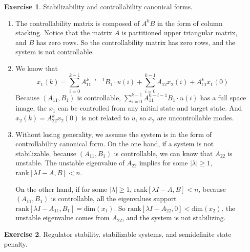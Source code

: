 \documentclass[11pt,a4paper]{report}
\theoremstyle{definition}\newtheorem{exercise}{Exercise}[chapter]
\begin{document}
\begin{exercise}Stabilizability and controllability canonical forms.\\
\end{exercise}
\begin{answer}
\begin{enumerate}[label=(\alph*)]
    \item The controllability matrix is composed of $A^kB$ in the form of column stacking. Notice that the matrix $A$ is partitioned upper triangular matrix, and $B$ has zero rows. So the controllability matrix has zero rows, and the system is not controllable.
    \item We know that
    \begin{equation}
        x_{1}\left(k\right)=\sum_{i=0}^{k-1}A_{11}^{k-i-1}B_1\cdot u\left(i\right)+\sum_{i=0}^{k-1}A_{12}x_{2}\left(i\right)+A_{11}^{k}x_1(0)
    \end{equation}
    Because $(A_{11},B_1)$ is controllable, $\sum_{i=0}^{k-1}A_{11}^{k-i-1}B_1\cdot u\left(i\right)$ has a full space image, the $x_{1}$ can be controlled from any initial state and target state. And $x_2(k)=A_{22}^k x_2(0)$ is not related to $u$, so $x_2$ are uncontrollable modes.
    
    \item Without losing generality, we assume the system is in the form of controllability canonical form. On the one hand, if a system is not stabilizable, because $(A_{11}, B_1)$ is controllable, we can know that $A_{22}$ is unstable. The unstable eigenvalue of $A_{22}$ implies for some $|\lambda|\geq 1$, $\text{rank}[\lambda I - A, B]<n$.

    On the other hand, if for some $|\lambda|\geq 1$, $\text{rank}[\lambda I - A, B]<n$, because $(A_{11}, B_1)$ is controllable, all the eigenvalues support $\text{rank}[\lambda I - A_{11}, B_1]=\text{dim}(x_1)$. So $\text{rank}[\lambda I - A_{22}, 0]<\text{dim}(x_2)$, the unstable eigenvalue comes from $A_{22}$, and the system is not stabilizing.
\end{enumerate}
\end{answer}


\begin{exercise}Regulator stability, stabilizable systems, and semidefinite state penalty.\\
\end{exercise}
\end{document}
